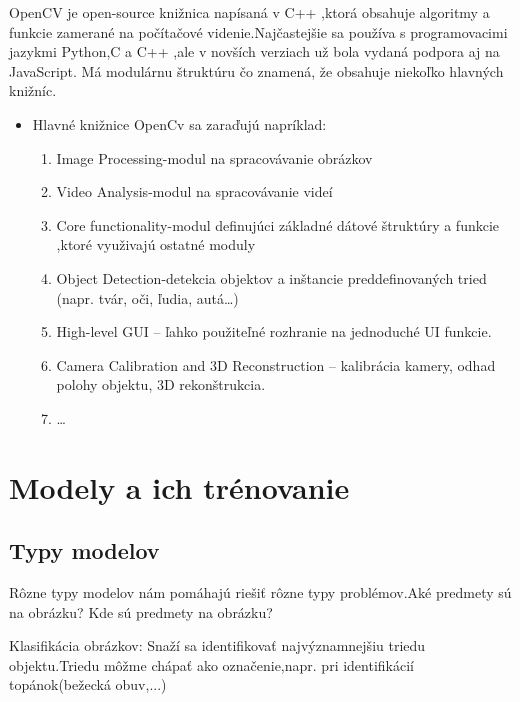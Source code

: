 \documentclass[10pt,twoside,slovak,a4paper]{coursepaper}
\begin{document}

OpenCV je  open-source knižnica napísaná v C++ ,ktorá obsahuje algoritmy a funkcie zamerané na počítačové videnie.Najčastejšie sa používa s programovacimi jazykmi Python,C a C++ ,ale v novších verziach už bola vydaná podpora aj na JavaScript. Má modulárnu štruktúru čo znamená, že obsahuje niekoľko hlavných knižníc.
\begin{itemize}
\item Hlavné knižnice OpenCv sa zaraďujú napríklad:
	\begin{enumerate}
	\item Image Processing-modul na spracovávanie obrázkov
	\item Video Analysis-modul na spracovávanie videí
	\item Core functionality-modul definujúci základné dátové štruktúry a funkcie ,ktoré využivajú ostatné moduly
	\item Object Detection-detekcia objektov a inštancie preddefinovaných tried (napr. tvár, oči, ľudia, autá…)
	\item High-level GUI – ľahko použiteľné rozhranie na jednoduché UI funkcie.
	\item Camera Calibration and 3D Reconstruction  – kalibrácia kamery, odhad polohy objektu, 3D rekonštrukcia.
	\item \ldots{}\cite{OpenCV}

	\end{enumerate}
\end{itemize}

\section{Modely a ich trénovanie} \label{nejaka}

\subsection{Typy modelov} \label{ina:nejako}
Rôzne typy modelov nám pomáhajú riešiť rôzne typy problémov.Aké predmety sú na obrázku? Kde sú predmety na obrázku?

 Klasifikácia obrázkov: Snaží sa identifikovať najvýznamnejšiu triedu objektu.Triedu môžme chápať ako označenie,napr. pri identifikácií topánok(bežecká obuv,...)
\end{document}
